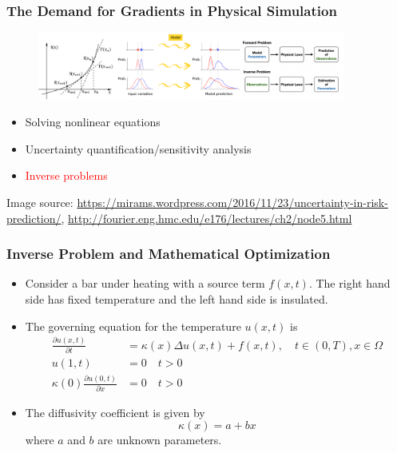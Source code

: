 \documentclass{beamer}
\newcommand{\red}[1]{\textcolor{red}{#1}}
\begin{document}
\begin{frame}
	\frametitle{The Demand for Gradients in Physical Simulation}

	\begin{figure}[hbt]
		\includegraphics[width=0.9\textwidth]{figures/illu.png}
	\end{figure}

	\begin{itemize}
		\item Solving nonlinear equations
		\item Uncertainty quantification/sensitivity analysis
		\item \red{Inverse problems}
	\end{itemize}

	\scriptsize{Image source: \url{https://mirams.wordpress.com/2016/11/23/uncertainty-in-risk-prediction/}, \url{http://fourier.eng.hmc.edu/e176/lectures/ch2/node5.html}}
\end{frame}


\begin{frame}
	\frametitle{Inverse Problem and Mathematical Optimization}

	\begin{itemize}
		\item Consider a bar under heating with a source term $f(x,t)$. The right hand side has fixed temperature and the left hand side is insulated.
		\item The governing equation for the temperature $u(x,t)$ is
		      \begin{align*}
			      \frac{\partial u({x}, t)}{\partial t}       & = \kappa(x)\Delta u({x}, t) + f({x}, t), \quad t\in (0,T), x\in \Omega \\
			      u(1, t)                                     & = 0 \quad t>0                                                          \\
			      \kappa(0)\frac{\partial u(0,t)}{\partial x} & = 0 \quad t>0
		      \end{align*}
		\item The diffusivity coefficient is given by
		      $$\kappa(x) = a + bx$$
		      where $a$ and $b$ are unknown parameters.
	\end{itemize}
\end{frame}
\end{document}
